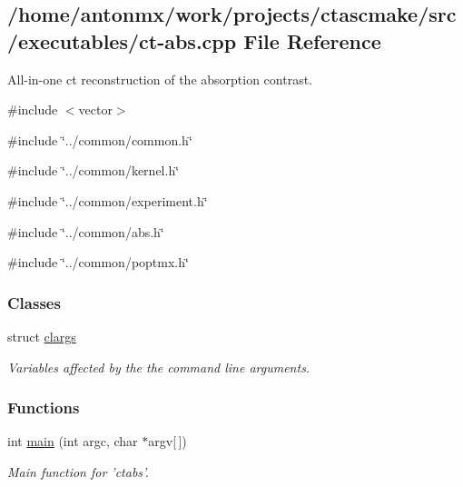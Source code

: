 \hypertarget{ct-abs_8cpp}{
\subsection{/home/antonmx/work/projects/ctascmake/src/executables/ct-\/abs.cpp File Reference}
\label{ct-abs_8cpp}
}


All-\/in-\/one ct reconstruction of the absorption contrast.  


{\ttfamily \#include $<$vector$>$}\par
{\ttfamily \#include \char`\"{}../common/common.h\char`\"{}}\par
{\ttfamily \#include \char`\"{}../common/kernel.h\char`\"{}}\par
{\ttfamily \#include \char`\"{}../common/experiment.h\char`\"{}}\par
{\ttfamily \#include \char`\"{}../common/abs.h\char`\"{}}\par
{\ttfamily \#include \char`\"{}../common/poptmx.h\char`\"{}}\par
\subsubsection*{Classes}
\begin{DoxyCompactItemize}
\item 
struct \hyperlink{structclargs}{clargs}
\begin{DoxyCompactList}\small\item\em Variables affected by the the command line arguments. \item\end{DoxyCompactList}\end{DoxyCompactItemize}
\subsubsection*{Functions}
\begin{DoxyCompactItemize}
\item 
int \hyperlink{ct-abs_8cpp_a0ddf1224851353fc92bfbff6f499fa97}{main} (int argc, char $\ast$argv\mbox{[}$\,$\mbox{]})
\begin{DoxyCompactList}\small\item\em Main function for 'ctabs'. \item\end{DoxyCompactList}\end{DoxyCompactItemize}


